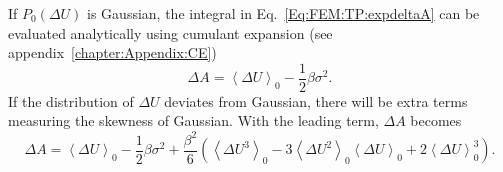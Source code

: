 If $P_{0}(\Delta U)$ is Gaussian, the integral in Eq.~\ref{Eq:FEM:TP:expdeltaA} can be evaluated analytically using cumulant expansion (see appendix~\ref{chapter:Appendix:CE})
\begin{equation}
  \Delta A = \left< \Delta U \right>_{0} - \frac{1}{2} \beta \sigma ^2.
  \label{Eq:FEM:TP:deltaA8}
\end{equation}
If the distribution of $\Delta U$ deviates from Gaussian, there will be extra terms measuring the skewness of Gaussian. With the leading term, $\Delta A$ becomes
\begin{equation}
  \Delta A = \left< \Delta U \right>_{0} - \frac{1}{2} \beta \sigma ^2 + \frac{\beta^2}{6} \left(\left<\Delta U^3\right>_0-3\left<\Delta U^2\right>_0\left<\Delta U\right>_0+2\left<\Delta U\right>_0^3\right).
  \label{Eq:FEM:TP:deltaA9}
\end{equation}


